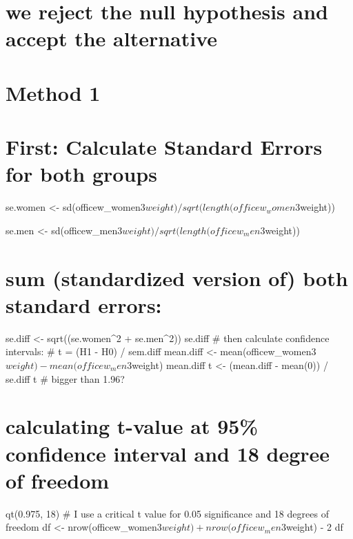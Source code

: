 \documentclass[
]{article}
\begin{document}
\hypertarget{we-reject-the-null-hypothesis-and-accept-the-alternative}{%
\section{we reject the null hypothesis and accept the
alternative}\label{we-reject-the-null-hypothesis-and-accept-the-alternative}}

\hypertarget{method-1}{%
\section{Method 1}\label{method-1}}

\hypertarget{first-calculate-standard-errors-for-both-groups}{%
\section{First: Calculate Standard Errors for both
groups}\label{first-calculate-standard-errors-for-both-groups}}

se.women \textless-
sd(officew\_women3\(weight) / sqrt(length(officew_women3\)weight))

se.men \textless-
sd(officew\_men3\(weight) / sqrt(length(officew_men3\)weight))

\hypertarget{sum-standardized-version-of-both-standard-errors}{%
\section{sum (standardized version of) both standard
errors:}\label{sum-standardized-version-of-both-standard-errors}}

se.diff \textless- sqrt((se.women\^{}2 + se.men\^{}2)) se.diff \# then
calculate confidence intervals: \# t = (H1 - H0) / sem.diff mean.diff
\textless- mean(officew\_women3\(weight) - mean(officew_men3\)weight)
mean.diff t \textless- (mean.diff - mean(0)) / se.diff t \# bigger than
1.96?

\hypertarget{calculating-t-value-at-95-confidence-interval-and-18-degree-of-freedom}{%
\section{calculating t-value at 95\% confidence interval and 18 degree
of
freedom}\label{calculating-t-value-at-95-confidence-interval-and-18-degree-of-freedom}}

qt(0.975, 18) \# I use a critical t value for 0.05 significance and 18
degrees of freedom df \textless-
nrow(officew\_women3\(weight) + nrow(officew_men3\)weight) - 2 df
\end{document}
